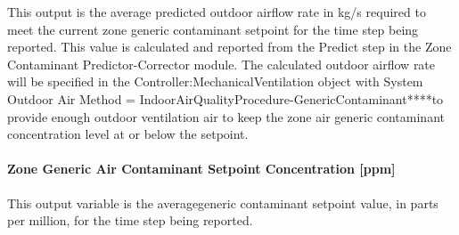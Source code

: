 This output is the average predicted outdoor airflow rate in kg/s required to meet the current zone generic contaminant setpoint for the time step being reported. This value is calculated and reported from the Predict step in the Zone Contaminant Predictor-Corrector module. The calculated outdoor airflow rate will be specified in the Controller:MechanicalVentilation object with System Outdoor Air Method = IndoorAirQualityProcedure-GenericContaminant****to provide enough outdoor ventilation air to keep the zone air generic contaminant concentration level at or below the setpoint.

\paragraph{Zone Generic Air Contaminant Setpoint Concentration {[}ppm{]}}\label{zone-generic-air-contaminant-setpoint-concentration-ppm}

This output variable is the averagegeneric contaminant setpoint value, in parts per million, for the time step being reported.
